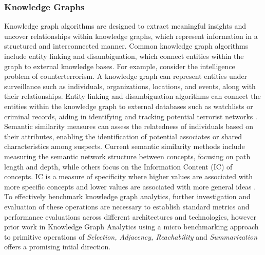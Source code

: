\documentclass[letterpaper, 10pt]{article}
\begin{document}
\begin{multicols}{2}
{{        \subsubsection{Knowledge Graphs}\label{section:knowledgeGraphs}
                
            Knowledge graph algorithms are designed to extract meaningful insights and uncover relationships within knowledge graphs, which represent information in a structured and interconnected manner.
            Common knowledge graph algorithms include entity linking and disambiguation, which connect entities within the graph to external knowledge bases.
            For example, consider the intelligence problem of counterterrorism. 
            A knowledge graph can represent entities under surveillance such as individuals, organizations, locations, and events, along with their relationships. 
            Entity linking and disambiguation algorithms can connect the entities within the knowledge graph to external databases such as watchlists or criminal records, aiding in identifying and tracking potential terrorist networks \cite{Xia2019}. 
            Semantic similarity measures can assess the relatedness of individuals based on their attributes, enabling the identification of potential associates or shared characteristics among suspects. Current semantic similarity methods include measuring the semantic network structure between concepts, focusing on path length and depth, while others focus on the Information Content (IC) of concepts. IC is a measure of specificity where higher values are associated with more specific concepts and lower values are associated with more general ideas \cite{Zhu2016}. To effectively benchmark knowledge graph analytics, further investigation and evaluation of these operations are necessary to establish standard metrics and performance evaluations across different architectures and technologies, however prior work in Knowledge Graph Analytics using a micro benchmarking approach to primitive operations of \textit{Selection, Adjacency, Reachability} and \textit{Summarization} \cite{Angles2013} offers a promising intial direction.
            
}}
\end{multicols}
\end{document}
